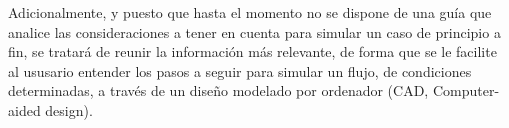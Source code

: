 Adicionalmente, y puesto que hasta el momento no se dispone de una guía
que analice las consideraciones a tener en cuenta para simular un caso
de principio a fin, se tratará de reunir la información más relevante,
de forma que se le facilite al ususario entender los pasos a seguir para
simular un flujo, de condiciones determinadas, a través de un diseño
modelado por ordenador (CAD, Computer-aided design).

